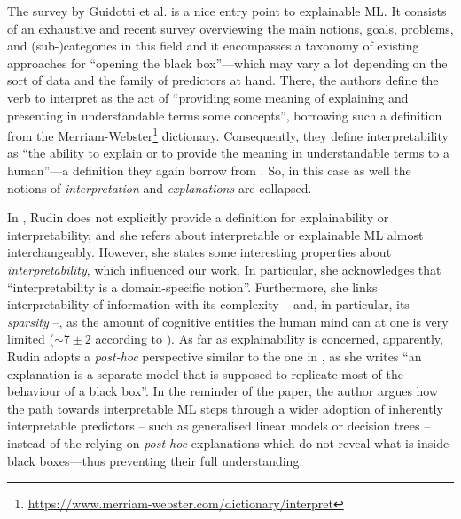 \documentclass[12pt,a4paper,openright,twoside]{book}
\begin{document}
The survey by Guidotti et al. \cite{GuidottiMRTGP19} is a nice entry point to explainable ML.
%
It consists of an exhaustive and recent survey overviewing the main notions, goals, problems, and (sub-)categories in this field and it encompasses a taxonomy of existing approaches for ``opening the black box''---which may vary a lot depending on the sort of data and the family of predictors at hand.
%
There, the authors define the verb to interpret as the act of ``providing some meaning of explaining and presenting in understandable terms some concepts'', borrowing such a definition from the Merriam-Webster\footnote{\url{https://www.merriam-webster.com/dictionary/interpret}} dictionary.
%
Consequently, they define interpretability as ``the ability to explain or to provide the meaning in understandable terms to a human''---a definition they again borrow from \cite{DoshiVelezK2017}.
%
So, in this case as well the notions of \emph{interpretation} and \emph{explanations} are collapsed.

In \cite{Rudin2019}, Rudin does not explicitly provide a definition for explainability or interpretability, and she refers about interpretable or explainable ML almost interchangeably.
%
However, she states some interesting properties about \emph{interpretability}, which influenced our work.
%
In particular, she acknowledges that ``interpretability is a domain-specific notion''.
%
Furthermore, she links interpretability of information with its complexity -- and, in particular, its \emph{sparsity} --, as the amount of cognitive entities the human mind can at one is very limited ($\sim 7 \pm 2$ according to \cite{numberseven-psyrev63}). 
%
As far as explainability is concerned, apparently, Rudin adopts a \emph{post-hoc} perspective similar to the one in \cite{Lipton18}, as she writes ``an explanation is a separate model that is supposed to replicate most of the behaviour of a black box''.
%
In the reminder of the paper, the author argues how the path towards interpretable ML steps through a wider adoption of inherently interpretable predictors -- such as generalised linear models or decision trees -- instead of the relying on \emph{post-hoc} explanations which do not reveal what is inside black boxes---thus preventing their full understanding.
\end{document}
